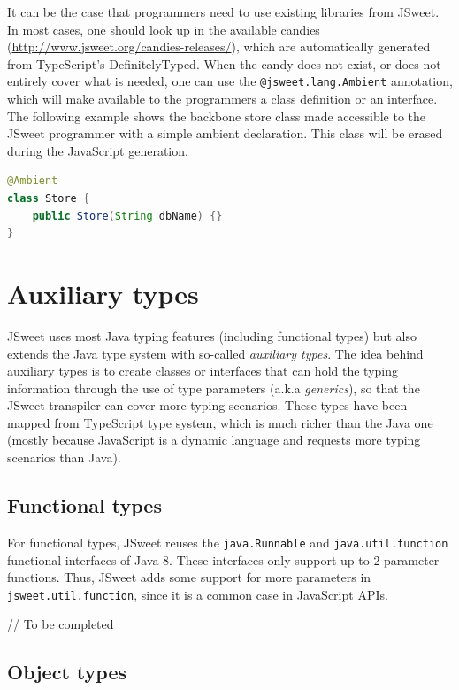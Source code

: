 \documentclass[a4paper]{report}
\begin{document}
It can be the case that programmers need to use existing libraries from JSweet. In most cases, one should look up in the available candies (\url{http://www.jsweet.org/candies-releases/}), which are automatically generated from TypeScript's DefinitelyTyped. When the candy does not exist, or does not entirely cover what is needed, one can use the \texttt{@jsweet.lang.Ambient} annotation, which will make available to the programmers a class definition or an interface. The following example shows the backbone store class made accessible to the JSweet programmer with a simple ambient declaration. This class will be erased during the JavaScript generation.

\begin{lstlisting}[language=Java]
@Ambient
class Store {
	public Store(String dbName) {}
}
\end{lstlisting}

\chapter{Auxiliary types}

JSweet uses most Java typing features (including functional types) but also extends the Java type system with so-called \emph{auxiliary types}. The idea behind auxiliary types is to create classes or interfaces that can hold the typing information through the use of type parameters (a.k.a \emph{generics}), so that the JSweet transpiler can cover more typing scenarios. These types have been mapped from TypeScript type system, which is much richer than the Java one (mostly because JavaScript is a dynamic language and requests more typing scenarios than Java). 

\section{Functional types}

For functional types, JSweet reuses the \texttt{java.\-Runnable} and \texttt{java.\-util.\-function} functional interfaces of Java 8. These interfaces only support up to 2-parameter functions. Thus, JSweet adds some support for more parameters in \texttt{jsweet.\-util.\-function}, since it is a common case in JavaScript APIs.

// To be completed

\section{Object types}
\end{document}
